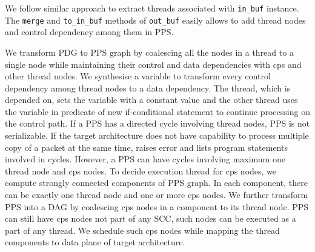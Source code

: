 \documentclass[letterpaper,twocolumn,10pt]{article}
\begin{document}



We follow similar approach to extract threads associated with \texttt{in\_buf} instance.
The \texttt{merge} and \texttt{to\_in\_buf} methods of \texttt{out\_buf} easily allows to add thread nodes and control dependency among them in PPS.

We transform PDG to PPS graph by coalescing all the nodes in a thread to a single node while maintaining their control and data dependencies with cps and other thread nodes.
We synthesise a variable to transform every control dependency among thread nodes to a data dependency.
The thread, which is depended on, sets the variable with a constant value and the other thread uses the variable in predicate of new if-conditional statement to continue processing on the control path.
If a PPS has a directed cycle involving thread nodes, PPS is not serializable.
If the target architecture does not have capability to process multiple copy of a packet at the same time,
\ucomp raises error and lists program statements involved in cycles.
However, a PPS can have cycles involving maximum one thread node and cps nodes.
To decide execution thread for cps nodes, we compute strongly connected components of PPS graph.
In each component, there can be exactly one thread node and one or more cps nodes.
We further transform PPS into a DAG by coalescing cps nodes in a component to its thread node.
PPS can still have cps nodes not part of any SCC, such nodes can be executed as a part of any thread.
We schedule such cps nodes while mapping the thread components to data plane of target architecture.


\end{document}
